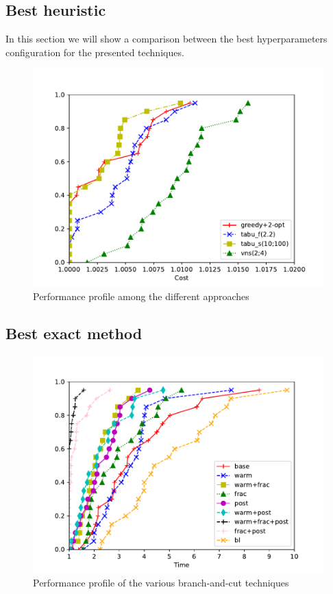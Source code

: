 \documentclass{article}
\begin{document}
\clearpage
\newpage
\subsection{Best heuristic}

In this section we will show a comparison between the best hyperparameters
configuration for the presented techniques.

\begin{figure}[ht]
        \caption{Performance profile among the different approaches}
        \label{fig:res_bestheu}
        \centering
        \includegraphics[width=340pt]{assets/res_bestheu.pdf}
\end{figure}

\clearpage
\newpage

\subsection{Best exact method}


\begin{figure}[ht]
        \caption{Performance profile of the various branch-and-cut techniques}
        \label{fig:ht_bec}
        \centering
        \includegraphics[width=340pt]{assets/ht_bec.pdf}
\end{figure}

\clearpage
\newpage



\end{document}
